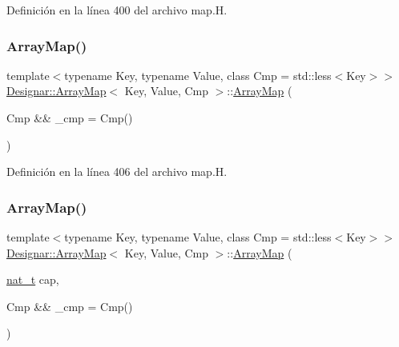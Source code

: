 Definición en la línea 400 del archivo map.\+H.

\mbox{\label{class_designar_1_1_array_map_ac7113b782b6ade75f5ccc843ecc2c153}} 
\subsubsection{\texorpdfstring{Array\+Map()}{ArrayMap()}\hspace{0.1cm}{\footnotesize\ttfamily [2/6]}}
{\footnotesize\ttfamily template$<$typename Key, typename Value, class Cmp = std\+::less$<$\+Key$>$$>$ \\
\hyperlink{class_designar_1_1_array_map}{Designar\+::\+Array\+Map}$<$ Key, Value, Cmp $>$\+::\hyperlink{class_designar_1_1_array_map}{Array\+Map} (\begin{DoxyParamCaption}\item[{Cmp \&\&}]{\+\_\+cmp = {\ttfamily Cmp()} }\end{DoxyParamCaption})\hspace{0.3cm}{\ttfamily [inline]}}



Definición en la línea 406 del archivo map.\+H.

\mbox{\label{class_designar_1_1_array_map_a553f96874d7e4037c333edd6dd76ba31}} 
\subsubsection{\texorpdfstring{Array\+Map()}{ArrayMap()}\hspace{0.1cm}{\footnotesize\ttfamily [3/6]}}
{\footnotesize\ttfamily template$<$typename Key, typename Value, class Cmp = std\+::less$<$\+Key$>$$>$ \\
\hyperlink{class_designar_1_1_array_map}{Designar\+::\+Array\+Map}$<$ Key, Value, Cmp $>$\+::\hyperlink{class_designar_1_1_array_map}{Array\+Map} (\begin{DoxyParamCaption}\item[{\hyperlink{namespace_designar_aa72662848b9f4815e7bf31a7cf3e33d1}{nat\+\_\+t}}]{cap,  }\item[{Cmp \&\&}]{\+\_\+cmp = {\ttfamily Cmp()} }\end{DoxyParamCaption})\hspace{0.3cm}{\ttfamily [inline]}}



